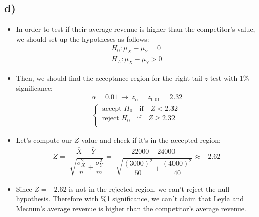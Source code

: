 \documentclass[12pt]{article}
\begin{document}
\subsection*{d)} 
\begin{itemize}
    \item In order to test if their average revenue is higher than the competitor's value, we should set up the hypotheses as follows:
    \begin{equation*}
        \begin{split}
            H_0: \mu_X - \mu_Y = 0 \\
            H_A: \mu_X - \mu_Y > 0
        \end{split}
    \end{equation*}
    \item Then, we should find the acceptance region for the right-tail $z$-test with 1\% significance:
    \begin{equation*}
        \begin{split}
            \alpha = 0.01 \ \rightarrow \ z_\alpha = z_{0.01} = 2.32 \\
            \begin{cases}
                \ \text{accept $H_0$} \quad \text{if} \quad Z < 2.32\\
                \ \text{reject $H_0$} \quad \text{if} \quad Z \geq 2.32\\
            \end{cases}
        \end{split}
    \end{equation*}
    \item Let's compute our $Z$ value and check if it's in the accepted region:
    \begin{equation*}
        \begin{split}
            Z = \dfrac{\overline{X} - \overline{Y}}{\sqrt[]{\dfrac{\sigma_X^2}{n} + \dfrac{\sigma_Y^2}{m}}} = \dfrac{22000 - 24000}{\sqrt[]{\dfrac{(3000)^2}{50} + \dfrac{(4000)^2}{40}}} \approx -2.62
        \end{split}
    \end{equation*}
    \item Since $Z = -2.62$ is not in the rejected region, we can't reject the null hypothesis. Therefore with \%1 significance, we can't claim that Leyla and Mecnun's average revenue is higher than the competitor's average revenue.
\end{itemize}
\end{document}
